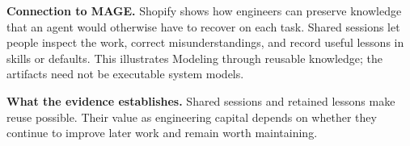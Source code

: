 \textbf{Connection to MAGE.} Shopify shows how engineers can preserve knowledge that an agent would otherwise have to recover on each task. Shared sessions let people inspect the work, correct misunderstandings, and record useful lessons in skills or defaults. This illustrates Modeling through reusable knowledge; the artifacts need not be executable system models.

\textbf{What the evidence establishes.} Shared sessions and retained lessons make reuse possible. Their value as engineering capital depends on whether they continue to improve later work and remain worth maintaining.
